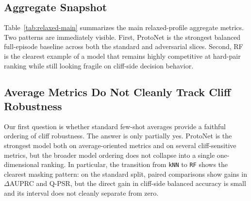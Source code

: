 \documentclass{article}
\begin{document}
\subsection{Aggregate Snapshot}

Table~\ref{tab:relaxed-main} summarizes the main relaxed-profile aggregate metrics. Two patterns are immediately
visible. First, ProtoNet is the strongest balanced full-episode baseline across both the standard and adversarial
slices. Second, RF is the clearest example of a model that remains highly competitive at hard-pair ranking while
still looking fragile on cliff-side decision behavior.

\begin{table}[t]
\centering
\caption{Aggregate relaxed-profile results for the full-strength model set. Higher is better for
$\Delta$AUPRC, C-BAcc, Q-PSR, and SQ-PSR; lower is better for SCR.}
\label{tab:relaxed-main}
\end{table}

\subsection{Average Metrics Do Not Cleanly Track Cliff Robustness}

Our first question is whether standard few-shot averages provide a faithful ordering of cliff robustness. The
answer is only partially yes. ProtoNet is the strongest model both on average-oriented metrics and on several
cliff-sensitive metrics, but the broader model ordering does not collapse into a single one-dimensional ranking. In
particular, the transition from \texttt{kNN} to \texttt{RF} shows the clearest masking pattern: on the standard
split, paired comparisons show gains in $\Delta$AUPRC and Q-PSR, but the direct gain in cliff-side balanced
accuracy is small and its interval does not cleanly separate from zero.
\end{document}
